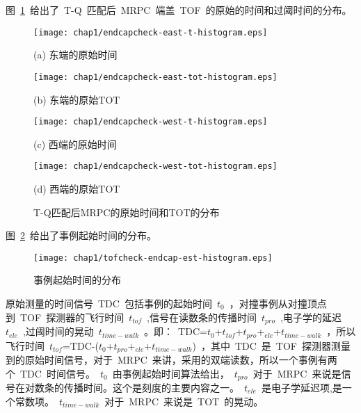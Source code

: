 图~\ref{fig:T and Q}~给出了~T-Q~匹配后~MRPC~端盖~TOF~的原始的时间和过阈时间的分布。
\begin{figure}[!h]
\begin{minipage}{0.48\linewidth}
  \centerline{ \centering \texttt{[image: chap1/endcapcheck-east-t-histogram.eps]}}
  \centerline{(a) 东端的原始时间}
  \centerline{\label{fig:endcapcheck-east-t-histogram}}
\end{minipage}
\begin{minipage}{0.48\linewidth}
  \centerline{ \centering \texttt{[image: chap1/endcapcheck-east-tot-histogram.eps]}}
  \centerline{(b) 东端的原始TOT}
  \centerline{\label{fig:endcapcheck-east-tot-histogram}}
\end{minipage}
\vfill
\begin{minipage}{0.48\linewidth}
  \centerline{ \centering  \texttt{[image: chap1/endcapcheck-west-t-histogram.eps]}}
  \centerline{(c) 西端的原始时间}
  \centerline{\label{fig:endcapcheck-west-t-histogram}}
\end{minipage}
\begin{minipage}{0.48\linewidth}
  \centerline{ \centering \texttt{[image: chap1/endcapcheck-west-tot-histogram.eps]}}
  \centerline{(d) 西端的原始TOT}
  \centerline{\label{fig:endcapcheck-west-tot-histogram}}
\end{minipage}
\caption{T-Q匹配后MRPC的原始时间和TOT的分布}
\label{fig:T and Q}
\end{figure}

图~\ref{fig:tofcheck-endcap-est-histogram}~给出了事例起始时间的分布。
\begin{figure}[!h]
  \centering
  \texttt{[image: chap1/tofcheck-endcap-est-histogram.eps]}
  \caption{事例起始时间的分布}
  \label{fig:tofcheck-endcap-est-histogram}
\end{figure}

原始测量的时间信号~TDC~包括事例的起始时间~$t_{0}$~，对撞事例从对撞顶点到~TOF~探测器的飞行时间~$t_{tof}$~,信号在读数条的传播时间~$t_{pro}$~,电子学的延迟~$t_{ele}$~,过阈时间的晃动~$t_{time-walk}$~。即：~TDC=$t_{0}$+$t_{tof}$+$t_{pro}$+$_{ele}$+$t_{time-walk}$~，所以飞行时间~$t_{tof}$=TDC-($t_{0}$+$t_{pro}$+$_{ele}$+$t_{time-walk}$)~，其中~TDC~是~TOF~探测器测量到的原始时间信号，对于~MRPC~来讲，采用的双端读数，所以一个事例有两个~TDC~时间信号。~$t_{0}$~由事例起始时间算法给出，~$t_{pro}$~对于~MRPC~来说是信号在对数条的传播时间。这个是刻度的主要内容之一。~$t_{ele}$~是电子学延迟项,是一个常数项。~$t_{time-walk}$~对于~MRPC~来说是~TOT~的晃动。
